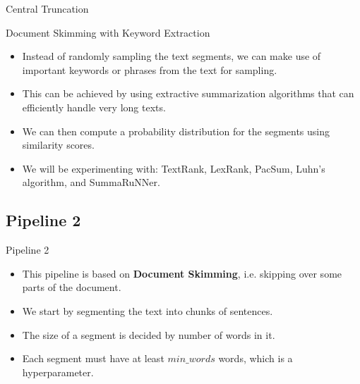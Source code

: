 \begin{frame}{Central Truncation}
\begin{frame}{Document Skimming with Keyword Extraction}
	\begin{itemize}
		\item Instead of randomly sampling the text segments, we can make use of important
		keywords or phrases from the text for sampling.
		\item<2-> This can be achieved by using extractive summarization algorithms that can
		efficiently handle very long texts.
		\item<3-> We can then compute a probability distribution for the segments using
		similarity scores.
		\item<4> We will be experimenting with: TextRank, LexRank, PacSum, Luhn's algorithm,
		and SummaRuNNer.
	\end{itemize}

\end{frame}




	


\subsection{Pipeline 2}

\begin{frame}{Pipeline 2}
	
	\begin{itemize}
		\item This pipeline is based on \textbf{Document Skimming}, i.e. skipping over some parts
		of the document.
		\item<2-> We start by segmenting the text into chunks of sentences.
		\item<3-> The size of a segment is decided by number of words in it.
		\item<4-> Each segment must have at least $min\_words$ words, which is a
		hyperparameter.
	\end{itemize}


\end{frame}
\end{frame}
